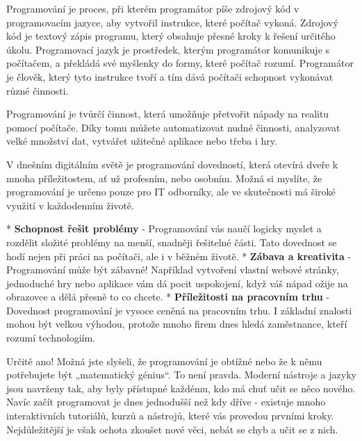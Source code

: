 Programování je proces, při kterém programátor píše zdrojový kód v programovacím jazyce, aby vytvořil instrukce, které počítač vykoná. Zdrojový kód je textový zápis programu, který obsahuje přesné kroky k řešení určitého úkolu. Programovací jazyk je prostředek, kterým programátor komunikuje s počítačem, a překládá své myšlenky do formy, které počítač rozumí. Programátor je člověk, který tyto instrukce tvoří a tím dává počítači schopnost vykonávat různé činnosti.

Programování je tvůrčí činnost, která umožňuje přetvořit nápady na realitu pomocí počítače. Díky tomu můžete automatizovat nudné činnosti, analyzovat velké množství dat, vytvářet užitečné aplikace nebo třeba i hry. 

V dnešním digitálním světě je programování dovedností, která otevírá dveře k mnoha příležitostem, ať už profesním, nebo osobním. Možná si myslíte, že programování je určeno pouze pro IT odborníky, ale ve skutečnosti má široké využití v každodenním životě.

\begitems
* {\bf Schopnost řešit problémy} - Programování vás naučí logicky myslet a rozdělit složité problémy na menší, snadněji řešitelné části. Tato dovednost se hodí nejen při práci na počítači, ale i v běžném životě.
* {\bf Zábava a kreativita} - Programování může být zábavné! Například vytvoření vlastní webové stránky, jednoduché hry nebo aplikace vám dá pocit uspokojení, když váš nápad ožije na obrazovce a dělá přesně to co chcete.
* {\bf Příležitosti na pracovním trhu} - Dovednost programování je vysoce ceněná na pracovním trhu. I základní znalosti mohou být velkou výhodou, protože mnoho firem dnes hledá zaměstnance, kteří rozumí technologiím.
\enditems

Určitě ano! Možná jste slyšeli, že programování je obtížné nebo že k němu potřebujete být „matematický génius“. To není pravda. Moderní nástroje a jazyky jsou navrženy tak, aby byly přístupné každému, kdo má chuť učit se něco nového.
Navíc začít programovat je dnes jednodušší než kdy dříve - existuje mnoho interaktivních tutoriálů, kurzů a nástrojů, které vás provedou prvními kroky. Nejdůležitější je však ochota zkoušet nové věci, nebát se chyb a učit se z nich.
